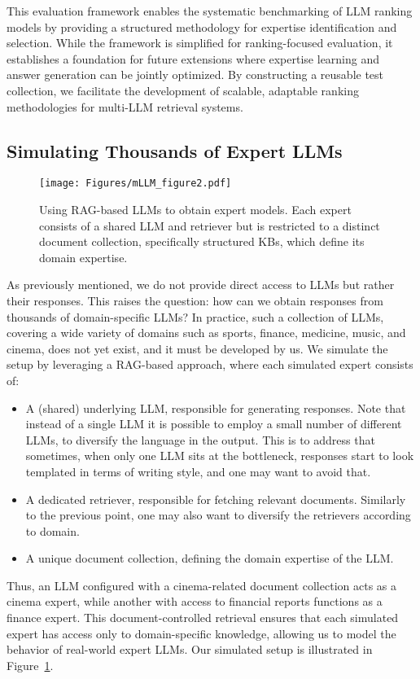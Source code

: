 This evaluation framework enables the systematic benchmarking of LLM ranking models by providing a structured methodology for expertise identification and selection. While the framework is simplified for ranking-focused evaluation, it establishes a foundation for future extensions where expertise learning and answer generation can be jointly optimized. By constructing a reusable test collection, we facilitate the development of scalable, adaptable ranking methodologies for multi-LLM retrieval systems.

\subsection{Simulating Thousands of Expert LLMs}
\label{sec:simulation}

\begin{figure}[t]
        \centering
        \texttt{[image: Figures/mLLM\_figure2.pdf]}
        \caption{Using RAG-based LLMs to obtain expert models. Each expert consists of a shared LLM and retriever but is restricted to a distinct document collection, specifically structured KBs,  which define its domain expertise.}
        \label{fig:simulation}
\end{figure}

As previously mentioned, we do not provide direct access to LLMs but rather their responses. This raises the question: how can we obtain responses from thousands of domain-specific LLMs?
In practice, such a collection of LLMs, covering a wide variety of domains such as sports, finance, medicine, music, and cinema, does not yet exist, and it must be developed by us. We simulate the setup by leveraging a RAG-based approach, where each simulated expert consists of:  
\begin{itemize}
    \item A (shared) underlying LLM, responsible for generating responses. Note that instead of a single LLM it is possible to employ a small number of different LLMs, to diversify the language in the output. This is to address that sometimes, when only one LLM sits at the bottleneck, responses start to look templated in terms of writing style, and one may want to avoid that.
    \item A dedicated retriever, responsible for fetching relevant documents. Similarly to the previous point, one may also want to diversify the retrievers according to domain.
    \item A unique document collection, defining the domain expertise of the LLM.
\end{itemize}
Thus, an LLM configured with a cinema-related document collection acts as a cinema expert, while another with access to financial reports functions as a finance expert. 
This document-controlled retrieval ensures that each simulated expert has access only to domain-specific knowledge, allowing us to model the behavior of real-world expert LLMs. Our simulated setup is illustrated in Figure~\ref{fig:simulation}.

